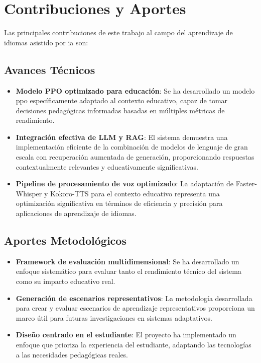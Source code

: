 \section{Contribuciones y Aportes}
\label{sec:contribuciones}

Las principales contribuciones de este trabajo al campo del aprendizaje de idiomas asistido por \gls{ia} son:

\subsection{Avances Técnicos}
\label{subsec:avances-tecnicos}

\begin{itemize}
    \item \textbf{Modelo PPO optimizado para educación}: Se ha desarrollado un modelo \gls{ppo} específicamente adaptado al contexto educativo, capaz de tomar decisiones pedagógicas informadas basadas en múltiples métricas de rendimiento.
    
    \item \textbf{Integración efectiva de LLM y RAG}: El sistema demuestra una implementación eficiente de la combinación de modelos de lenguaje de gran escala con recuperación aumentada de generación, proporcionando respuestas contextualmente relevantes y educativamente significativas.
    
    \item \textbf{Pipeline de procesamiento de voz optimizado}: La adaptación de Faster-Whisper y Kokoro-TTS para el contexto educativo representa una optimización significativa en términos de eficiencia y precisión para aplicaciones de aprendizaje de idiomas.
\end{itemize}

\subsection{Aportes Metodológicos}
\label{subsec:aportes-metodologicos}

\begin{itemize}
    \item \textbf{Framework de evaluación multidimensional}: Se ha desarrollado un enfoque sistemático para evaluar tanto el rendimiento técnico del sistema como su impacto educativo real.
    
    \item \textbf{Generación de escenarios representativos}: La metodología desarrollada para crear y evaluar escenarios de aprendizaje representativos proporciona un marco útil para futuras investigaciones en sistemas adaptativos.
    
    \item \textbf{Diseño centrado en el estudiante}: El proyecto ha implementado un enfoque que prioriza la experiencia del estudiante, adaptando las tecnologías a las necesidades pedagógicas reales.
\end{itemize}

